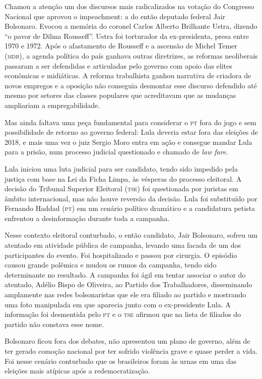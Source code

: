 Chamou a atenção um dos discursos mais radicalizados na votação do
Congresso Nacional que aprovou o impeachment: a do então deputado
federal Jair Bolsonaro. Evocou a memória do coronel Carlos Alberto
Brilhante Ustra, dizendo ``o pavor de Dilma Rousseff''. Ustra foi
torturador da ex-presidenta, presa entre 1970 e 1972. Após o afastamento
de Rousseff e a ascensão de Michel Temer (\textsc{mdb}), a agenda política do país
ganhava outras diretrizes, as reformas neoliberais passaram a ser
defendidas e articuladas pelo governo com apoio das elites econômicas e
midiáticas. A reforma trabalhista ganhou narrativa de criadora de novos
empregos e a oposição não conseguia desmontar esse discurso defendido
até mesmo por setores das classes populares que acreditavam que as
mudanças ampliariam a empregabilidade.

Mas ainda faltava uma peça fundamental para considerar o \textsc{pt} fora do jogo
e sem possibilidade de retorno ao governo federal: Lula deveria estar
fora das eleições de 2018, e mais uma vez o juiz Sergio Moro entra em
ação e consegue mandar Lula para a prisão, num processo judicial
questionado e chamado de \textit{law fare}.

Lula iniciou uma luta judicial para ser candidato, tendo sido impedido
pela justiça com base na Lei da Ficha Limpa, às vésperas do processo
eleitoral. A decisão do Tribunal Superior Eleitoral (\textsc{tse}) foi questionada por
juristas em âmbito internacional, mas não houve reversão da decisão.
Lula foi substituído por Fernando Haddad (\textsc{pt}) em um cenário político
dramático e a candidatura petista enfrentou a desinformação durante toda a
campanha.

Nesse contexto eleitoral conturbado, o então candidato, Jair Bolsonaro,
sofreu um atentado em atividade pública de campanha, levando uma facada
de um dos participantes do evento. Foi hospitalizado e passou por
cirurgia. O episódio causou grande polêmica e mudou os rumos da
campanha, tendo sido determinante no resultado. A campanha foi ágil em
tentar associar o autor do atentado, Adélio Bispo de Oliveira, ao
Partido dos Trabalhadores, disseminando amplamente nas redes
bolsonaristas que ele era filiado ao partido e mostrando uma foto
manipulada em que aparecia junto com o ex-presidente Lula. A informação
foi desmentida pelo \textsc{pt} e o \textsc{tse} afirmou que na
lista de filiados do partido não constava esse nome.

Bolsonaro ficou fora dos debates, não apresentou um plano de governo,
além de ter gerado comoção nacional por ter sofrido violência grave e
quase perder a vida. Foi nesse cenário conturbado que os brasileiros
foram às urnas em uma das eleições mais atípicas após a redemocratização.

